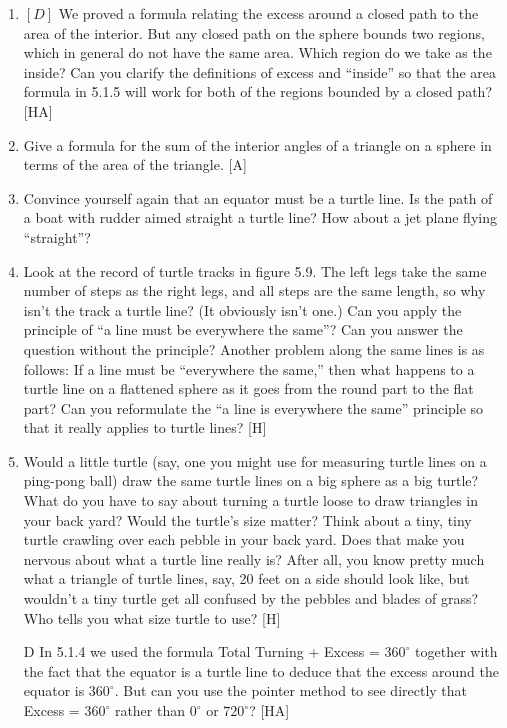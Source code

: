 \documentclass{book}
\begin{document}
\begin{enumerate}
\item $[D]$ We proved a formula relating the excess around a closed path
to the area of the interior. But any closed path on the sphere bounds
two regions, which in general do not have the same area. Which region
do we take as the inside? Can you clarify the definitions of excess and
``inside'' so that the area formula in 5.1.5 will work for both of the regions
bounded by a closed path? [HA]

\item Give a formula for the sum of the interior angles of a triangle on a
sphere in terms of the area of the triangle. [A]

\item Convince yourself again that an equator must be a turtle line. Is the
path of a boat with rudder aimed straight a turtle line? How about a
jet plane flying ``straight''?

\item Look at the record of turtle tracks in figure 5.9. The left legs take
the same number of steps as the right legs, and all steps are the same
length, so why isn't the track a turtle line? (It obviously isn't one.) Can
you apply the principle of ``a line must be everywhere the same''? Can
you answer the question without the principle? Another problem along
the same lines is as follows: If a line must be ``everywhere the same,''
then what happens to a turtle line on a flattened sphere as it goes from
the round part to the flat part? Can you reformulate the ``a line is
everywhere the same'' principle so that it really applies to turtle lines?
[H]

\item Would a little turtle (say, one you might use for measuring turtle
lines on a ping-pong ball) draw the same turtle lines on a big sphere as
a big turtle? What do you have to say about turning a turtle loose to
draw triangles in your back yard? Would the turtle's size matter? Think
about a tiny, tiny turtle crawling over each pebble in your back yard.
Does that make you nervous about what a turtle line really is? After all,
you know pretty much what a triangle of turtle lines, say, 20 feet on a
side should look like, but wouldn't a tiny turtle get all confused by the
pebbles and blades of grass? Who tells you what size turtle to use? [H]

\item [D] In 5.1.4 we used the formula Total Turning + Excess = $360^{\circ}$
together with the fact that the equator is a turtle line to deduce that the
excess around the equator is $360^{\circ}$. But can you use the pointer method
to see directly that Excess = $360^{\circ}$ rather than $0^{\circ}$ or $720^{\circ}$? [HA]


\end{enumerate}
\end{document}
